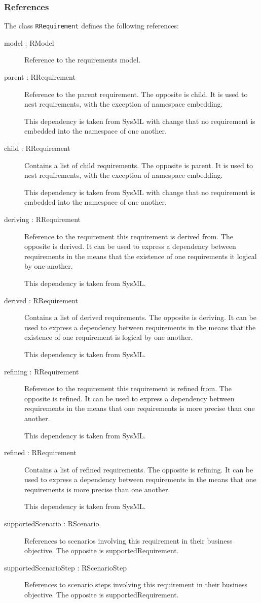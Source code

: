 \subsubsection{References}
The class \verb|RRequirement| defines the following references:
\begin{description}
	\item[model : RModel] Reference to the requirements model.
	\item[parent : RRequirement] Reference to the parent requirement. The opposite is child.
It is used to nest requirements, with the exception of namespace embedding.

This dependency is taken from SysML with change that no requirement is embedded into the namespace of one another.
	\item[child : RRequirement] Contains a list of child requirements. The opposite is parent.
It is used to nest requirements, with the exception of namespace embedding.

This dependency is taken from SysML with change that no requirement is embedded into the namespace of one another.
	\item[deriving : RRequirement] Reference to the requirement this requirement is derived from. The opposite is derived.
It can be used to express a dependency between requirements in the means that the existence of one requirements it logical by one another.

This dependency is taken from SysML.
	\item[derived : RRequirement] Contains a list of derived requirements. The opposite is deriving.
It can be used to express a dependency between requirements in the means that the existence of one requirement is logical by one another.

This dependency is taken from SysML.
	\item[refining : RRequirement] Reference to the requirement this requirement is refined from. The opposite is refined.
It can be used to express a dependency between requirements in the means that one requirements is more precise than one another.

This dependency is taken from SysML.
	\item[refined : RRequirement] Contains a list of refined requirements. The opposite is refining.
It can be used to express a dependency between requirements in the means that one requirements is more precise than one another.

This dependency is taken from SysML.
	\item[supportedScenario : RScenario] References to scenarios involving this requirement in their business objective.
The opposite is supportedRequirement.
	\item[supportedScenarioStep : RScenarioStep] References to scenario steps involving this requirement in their business objective.
The opposite is supportedRequirement.
\end{description}

